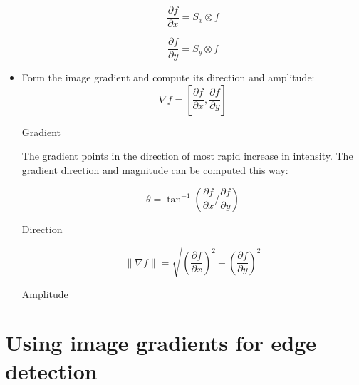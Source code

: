 \documentclass{article}
\begin{document}
\begin{itemize}
    \noindent\begin{minipage}{.5\linewidth}
    \begin{equation*}
        \frac{\partial f}{\partial x} = S_x \otimes f
    \end{equation*}
    \end{minipage}%
    \begin{minipage}{.5\linewidth}
    \begin{equation*}
        \frac{\partial f}{\partial y} = S_y \otimes f
    \end{equation*}
    \end{minipage}

    \item Form the image gradient and compute its direction and amplitude: \\

    \begin{equation*}
        \nabla f = \left[ \frac{\partial f}{\partial x}, \frac{\partial f}{\partial y} \right]        
    \end{equation*}
    \begin{center}
        Gradient
    \end{center}

    The gradient points in the direction of most rapid increase in intensity. The gradient direction and magnitude can be computed this way:

    \begin{equation*}
        \theta = \tan^{-1}{\left( \frac{\partial f}{\partial x} / \frac{\partial f}{\partial y} \right)}
    \end{equation*}
    \begin{center}
        Direction
    \end{center}

    \begin{equation*}
        \|\nabla f\| = \sqrt{\left( \frac{\partial f}{\partial x} \right)^2 + \left( \frac{\partial f}{\partial y} \right)^2}
    \end{equation*}
    \begin{center}
        Amplitude
    \end{center}
\end{itemize}

\newpage

\section*{Using image gradients for edge detection}
\end{document}
